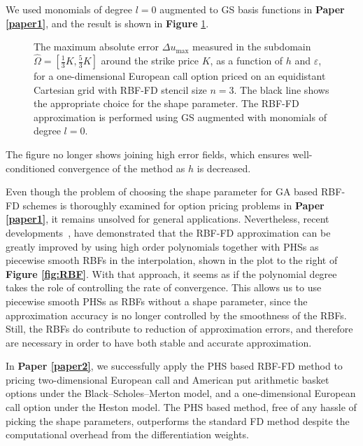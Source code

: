 \documentclass{UUThesisTemplate}
\begin{document}
\par
We used monomials of degree $l=0$ augmented to GS basis functions in \textbf{Paper \ref{paper1}}, and the result is shown in \textbf{Figure} \ref{fig:contour2}. 
\begin{figure}[H]
\centering


\caption{The maximum absolute error $\Delta u_{\max}$ measured in the subdomain $\hat\Omega=[\frac{1}{3}K,\frac{5}{3}K]$ around the strike price $K$, as a function of $h$ and $\varepsilon$, for a one-dimensional European call option priced on an equidistant Cartesian grid with RBF-FD stencil size $n=3$. The black line shows the appropriate choice for the shape parameter. The RBF-FD approximation is performed using GS augmented with monomials of degree $l=0$.}
\label{fig:contour2}
\end{figure}
\noindent The figure no longer shows joining high error fields, which ensures well-conditioned convergence of the method as $h$ is decreased.

\par
Even though the problem of choosing the shape parameter for GA based RBF-FD schemes is thoroughly examined for option pricing problems in \textbf{Paper \ref{paper1}}, it remains unsolved for general applications. Nevertheless, recent developments~\cite{flyer2016on, bayona2017role}, have demonstrated that the RBF-FD approximation can be greatly improved by using high order polynomials together with PHSs as piecewise smooth RBFs in the interpolation, shown in the plot to the right of \textbf{Figure \ref{fig:RBF}}. With that approach, it seems as if the polynomial degree takes the role of controlling the rate of convergence. This allows us to use piecewise smooth PHSs as RBFs without a shape parameter, since the approximation accuracy is no longer controlled by the smoothness of the RBFs. Still, the RBFs do contribute to reduction of approximation errors, and therefore are necessary in order to have both stable and accurate approximation.

\par
In \textbf{Paper \ref{paper2}}, we successfully apply the PHS based RBF-FD method to pricing two-dimensional European call and American put arithmetic basket options under the Black--Scholes--Merton model, and a one-dimensional European call option under the Heston model. The PHS based method, free of any hassle of picking the shape parameters, outperforms the standard FD method despite the computational overhead from the differentiation weights.
%
\end{document}
